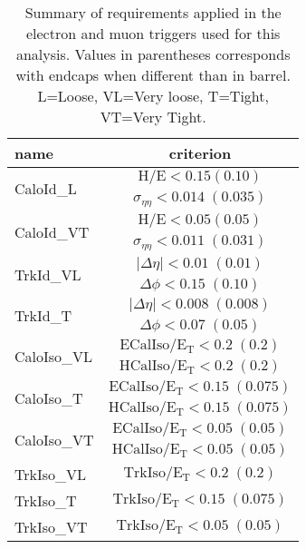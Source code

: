 \begin{table}[htb]
 \caption{Summary of requirements applied in the electron and muon triggers used for this analysis. 
Values in parentheses corresponds with endcaps when different than in barrel. L=Loose, VL=Very loose, T=Tight, VT=Very Tight.}
    \vspace{5pt}
 \label{tab:HLTElectronCuts}
 \centering
 \begin{tabular}{l|c}
   \hline
   name                       &  criterion \\
   \hline \hline
   \multirow{2}{*}{CaloId\_L} & $\mathrm{H/E < 0.15 (0.10) }$ \\
                               & $\sigma_{\eta\eta}\mathrm{< 0.014\;(0.035)}$ \\
    \hline
   \multirow{2}{*}{CaloId\_VT} & $\mathrm{H/E < 0.05 (0.05) }$ \\
                               & $\sigma_{\eta\eta}\mathrm{< 0.011\;(0.031)}$ \\
    \hline \hline
    \multirow{2}{*}{TrkId\_VL} & $|\Delta\eta|\mathrm{< 0.01\; (0.01)}$ \\
                               & $\Delta\phi\mathrm{< 0.15\;(0.10)}$  \\
    \hline
    \multirow{2}{*}{TrkId\_T} & $|\Delta\eta|\mathrm{< 0.008\; (0.008)}$ \\
                               & $\Delta\phi\mathrm{< 0.07\;(0.05)}$  \\
    \hline \hline
    \multirow{2}{*}{CaloIso\_VL} & $\mathrm{ECalIso/E_T <0.2\;(0.2)}$ \\
                                 & $\mathrm{HCalIso/E_T <0.2\;(0.2)}$ \\    
    \hline
    \multirow{2}{*}{CaloIso\_T} & $\mathrm{ECalIso/E_T <0.15\;(0.075)}$ \\
                                 & $\mathrm{HCalIso/E_T <0.15\;(0.075)}$ \\
    \hline
    \multirow{2}{*}{CaloIso\_VT} & $\mathrm{ECalIso/E_T <0.05\;(0.05)}$ \\
                                 & $\mathrm{HCalIso/E_T <0.05\;(0.05)}$ \\
    \hline \hline
    TrkIso\_VL                   & $\mathrm{TrkIso/E_T <0.2\;(0.2)}$ \\
    \hline
    TrkIso\_T                   & $\mathrm{TrkIso/E_T <0.15\;(0.075)}$ \\
   \hline
    TrkIso\_VT                   & $\mathrm{TrkIso/E_T <0.05\;(0.05)}$ \\
    \hline
 \end{tabular}
\end{table}

